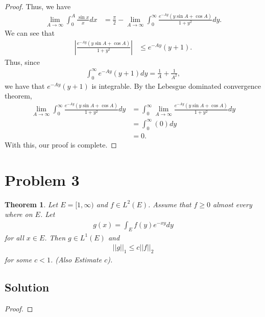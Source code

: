 \documentclass[10pt,a4paper]{article}
\theoremstyle{theorem}
\newtheorem{theorem}{Theorem}
\theoremstyle{definition}
\begin{document}
\begin{proof}
Thus, we have
\begin{align*}
\lim_{A \to \infty} \int_0^A \frac{\sin x}{x}dx &= \frac{\pi}{2} - \lim_{A \to \infty}\int_0^\infty \frac{e^{-Ay}(y \sin A + \cos A)}{1 + y^2} dy.
\end{align*}
We can see that 
\begin{align*}
\left| \frac{e^{-Ay}(y \sin A + \cos A)}{1 + y^2} \right| &\leq e^{-Ay}(y + 1).
\end{align*}
Thus, since 
\begin{align*}
\int_0^\infty e^{-Ay}(y + 1) dy = \frac{1}{A} + \frac{1}{A^2},
\end{align*}
we have that $e^{-Ay}(y + 1)$ is integrable. By the Lebesgue dominated convergence theorem,
\begin{align*}
\lim_{A \to \infty}\int_0^\infty \frac{e^{-Ay}(y \sin A + \cos A)}{1 + y^2} dy &= \int_0^\infty \lim_{A \to \infty} \frac{e^{-Ay}(y \sin A + \cos A)}{1 + y^2} dy\\
&= \int_0^\infty (0) dy\\
&= 0.
\end{align*}
With this, our proof is complete.
\end{proof}

\section*{Problem 3}
\begin{theorem}
Let $E = [1, \infty)$ and $f \in L^2(E)$. Assume that $f \geq 0$ almost every where on $E$. Let 
\begin{align*}
g(x) = \int_E f(y) e^{-xy} dy
\end{align*}
for all $x \in E$. Then $g \in L^1(E)$ and 
\begin{align*}
||g||_1 \leq c ||f||_2
\end{align*}
for some $c < 1$. (Also Estimate $c$).
\end{theorem}

\subsection*{Solution}
\begin{proof}

\end{proof}
\end{document}

